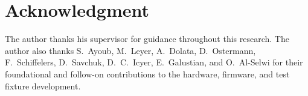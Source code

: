\documentclass[journal, a4paper]{IEEEtran}
\begin{document}
\section*{Acknowledgment}

The author thanks his supervisor for guidance throughout this research. The author also thanks S.~Ayoub, M.~Leyer, A.~Dolata, D.~Ostermann, F.~Schiffelers, D.~Savchuk, D.~C.~Icyer, E.~Galustian, and O.~Al-Selwi for their foundational and follow-on contributions to the hardware, firmware, and test fixture development.



\end{document}
